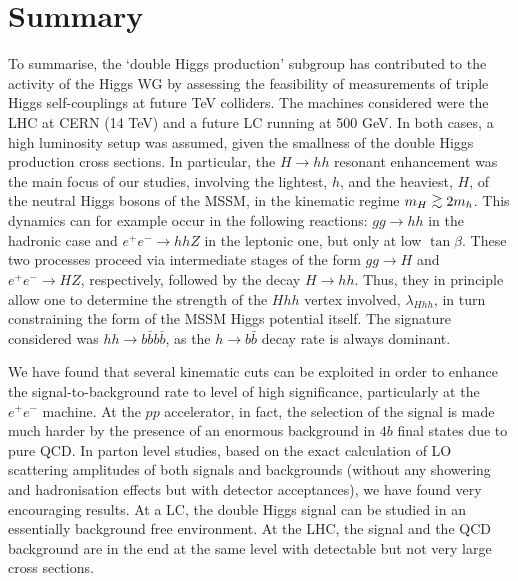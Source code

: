 \section{Summary}
\label{sec_conclusions}

To summarise, the `double Higgs production' subgroup has contributed
to the activity of the Higgs WG by assessing the feasibility of
measurements of triple Higgs self-couplings at future TeV colliders.
The machines considered were the LHC at CERN (14 TeV) and a future LC
running at 500 GeV.  In both cases, a high luminosity setup was
assumed, given the smallness of the double Higgs production cross
sections.  In particular, the $H\to hh$ resonant enhancement was the
main focus of our studies, involving the lightest, $h$, and the
heaviest, $H$, of the neutral Higgs bosons of the MSSM, in the
kinematic regime $m_H\OOrd2m_h$. This dynamics can for example occur
in the following reactions: $gg\to hh$ in the hadronic case and
$e^+e^-\to hhZ$ in the leptonic one, but only at low $\tan\beta$.
These two processes proceed via intermediate stages of the form $gg\to
H$ and $e^+e^-\to HZ$, respectively, followed by the decay $H\to hh$.
Thus, they in principle allow one to determine the strength of the
$Hhh$ vertex involved, $\lambda_{Hhh}$, in turn constraining the form
of the MSSM Higgs potential itself. The signature considered was
$hh\to b\bar b b\bar b$, as the $h\to b\bar b$ decay rate is always
dominant.

We have found that several kinematic cuts can be exploited in order to
enhance the signal-to-background rate to level of high significance,
particularly at the $e^+e^-$ machine. At the $pp$ accelerator, in
fact, the selection of the signal is made much harder by the presence
of an enormous background in $4b$ final states due to pure QCD. In
parton level studies, based on the exact calculation of LO scattering
amplitudes of both signals and backgrounds (without any showering and
hadronisation effects but with detector acceptances), we have found
very encouraging results. At a LC, the double Higgs signal can be
studied in an essentially background free environment. 
 At the LHC, the signal and the QCD background are in the end
at the same level with detectable but not very large cross sections.

